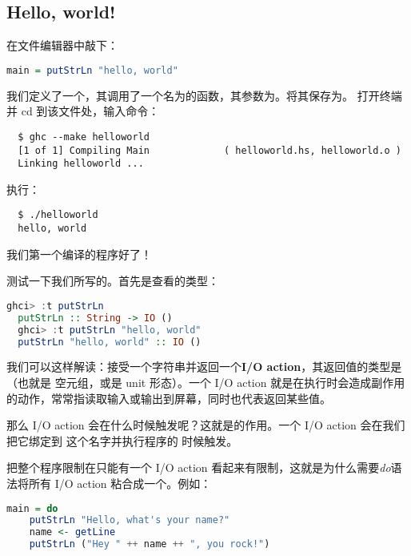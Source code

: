 \documentclass[./main.tex]{subfiles}
\begin{document}
\subsection*{Hello, world!}

在文件编辑器中敲下：

\begin{lstlisting}[language=Haskell]
  main = putStrLn "hello, world"
\end{lstlisting}

我们定义了一个，其调用了一个名为的函数，其参数为。将其保存为。
打开终端并 cd 到该文件处，输入命令：

\begin{lstlisting}
  $ ghc --make helloworld
  [1 of 1] Compiling Main             ( helloworld.hs, helloworld.o )
  Linking helloworld ...
\end{lstlisting}

执行：

\begin{lstlisting}
  $ ./helloworld
  hello, world
\end{lstlisting}

我们第一个编译的程序好了！

测试一下我们所写的。首先是查看的类型：

\begin{lstlisting}[language=Haskell]
  ghci> :t putStrLn
  putStrLn :: String -> IO ()
  ghci> :t putStrLn "hello, world"
  putStrLn "hello, world" :: IO ()
\end{lstlisting}

我们可以这样解读：接受一个字符串并返回一个\textbf{I/O action}，其返回值的类型是\acode{()}（也就是
空元组，或是 unit 形态）。一个 I/O action 就是在执行时会造成副作用的动作，常常指读取输入或输出到屏幕，同时也代表返回某些值。

那么 I/O action 会在什么时候触发呢？这就是的作用。一个 I/O action 会在我们把它绑定到  这个名字并执行程序的
时候触发。

把整个程序限制在只能有一个 I/O action 看起来有限制，这就是为什么需要\textit{do}语法将所有 I/O action 粘合成一个。例如：

\begin{lstlisting}[language=Haskell]
  main = do
    putStrLn "Hello, what's your name?"
    name <- getLine
    putStrLn ("Hey " ++ name ++ ", you rock!")
\end{lstlisting}
\end{document}
